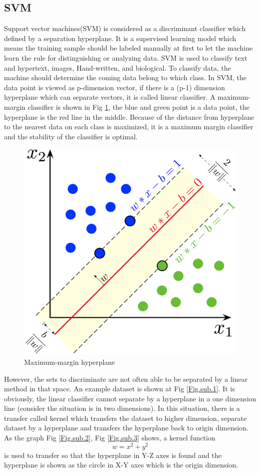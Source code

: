 \documentclass[a4paper,12pt]{article}
\begin{document}
\subsection{SVM}
Support vector machines(SVM) is considered as a discriminant classifier which defined by a separation hyperplane\parencite{patel_2019}. It is a supervised learning model which means the training sample should be labeled manually at first to let the machine learn the rule for distinguishing or analyzing data. SVM is used to classify text and hypertext, images, Hand-written, and biological\parencite{wiki:svm}. To classify data, the machine should determine the coming data belong to which class. In SVM, the data point is viewed as p-dimension vector,  if there is a (p-1) dimension hyperplane which can separate vectors, it is called linear classifier. A maximum-margin classifier is shown in Fig \ref{fig:svm_liner}, the blue and green point is a data point, the hyperplane is the red line in the middle. Because of the distance from hyperplane to the nearest data on each class is maximized, it is a maximum margin classifier and the stability of the classifier is optimal.

\begin{figure}[H]
\centering
\includegraphics[width = .8\textwidth]{SVM_margin.png}
\caption{Maximum-margin hyperplane\autocite{wiki:svm}}
\label{fig:svm_liner}
\end{figure}

However, the sets to discriminate are not often able to be separated by a linear method in that space\parencite{wiki:svm}. An example dataset is shown at Fig \ref{Fig.sub.1}. It is obviously, the linear classifier cannot separate by a hyperplane in a one dimension line (consider the situation is in two dimensions). In this situation, there is a transfer called kernel which transfers the dataset to higher dimension, separate dataset by a hyperplane and transfers the hyperplane back to origin dimension. As the graph Fig \ref{Fig.sub.2}, Fig \ref{Fig.sub.3} shows, a kernel function \[w = x^2 + y ^2\] is used to transfer so that the hyperplane in Y-Z axes is found and the hyperplane is shown as the circle in X-Y axes which is the origin dimension.
\end{document}
